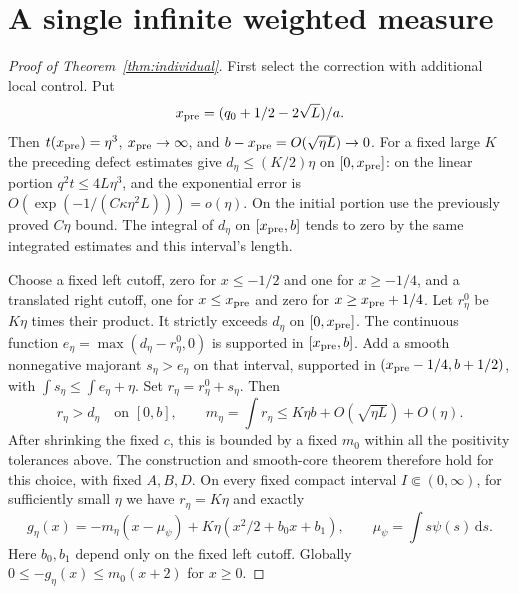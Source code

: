 \documentclass[11pt]{article}
\theoremstyle{remark}
\begin{document}
\section{A single infinite weighted measure}
\begin{proof}[Proof of Theorem~\ref{thm:individual}]
First select the correction with additional local control. Put
\[
 x_{\rm pre}=(q_0+1/2-2\sqrt L)/a.
\]
Then $t(x_{\rm pre})=\eta^3$, $x_{\rm pre}\to\infty$, and
$b-x_{\rm pre}=O(\sqrt{\eta L})\to0$.
For a fixed large $K$ the preceding defect estimates give
$d_\eta\leq(K/2)\eta$ on $[0,x_{\rm pre}]$:
on the linear portion $q^2t\leq4L\eta^3$, and the exponential error is
$O(\exp(-1/(C\kappa\eta^2L)))=o(\eta)$.
On the initial portion use the previously proved $C\eta$ bound.
The integral of $d_\eta$ on $[x_{\rm pre},b]$ tends to zero by the same
integrated estimates and this interval's length.

Choose a fixed left cutoff, zero for $x\leq-1/2$ and one for $x\geq-1/4$,
and a translated right cutoff, one for $x\leq x_{\rm pre}$ and zero for
$x\geq x_{\rm pre}+1/4$.
Let $r^0_\eta$ be $K\eta$ times their product. It strictly exceeds $d_\eta$
on $[0,x_{\rm pre}]$. The continuous function
$e_\eta=\max(d_\eta-r^0_\eta,0)$ is supported in $[x_{\rm pre},b]$.
Add a smooth nonnegative majorant $s_\eta>e_\eta$ on that interval,
supported in $(x_{\rm pre}-1/4,b+1/2)$, with
$\int s_\eta\leq\int e_\eta+\eta$.
Set $r_\eta=r^0_\eta+s_\eta$. Then
\[
 r_\eta>d_\eta\quad\text{on }[0,b],\qquad
 m_\eta=\int r_\eta\leq K\eta b+O(\sqrt{\eta L})+O(\eta).
\]
After shrinking the fixed $c$, this is bounded by a fixed $m_0$ within all
the positivity tolerances above. The construction and smooth-core theorem
therefore hold for this choice, with fixed $A,B,D$.
On every fixed compact interval $I\Subset(0,\infty)$, for sufficiently small
$\eta$ we have $r_\eta=K\eta$ and exactly
\begin{equation}\label{eq:localcorrection}
 g_\eta(x)=-m_\eta(x-\mu_\psi)
              +K\eta(x^2/2+b_0x+b_1),\qquad
 \mu_\psi=\int s\psi(s)\,\mathrm ds.
\end{equation}
Here $b_0,b_1$ depend only on the fixed left cutoff.
Globally $0\leq-g_\eta(x)\leq m_0(x+2)$ for $x\geq0$.


\end{proof}
\end{document}
